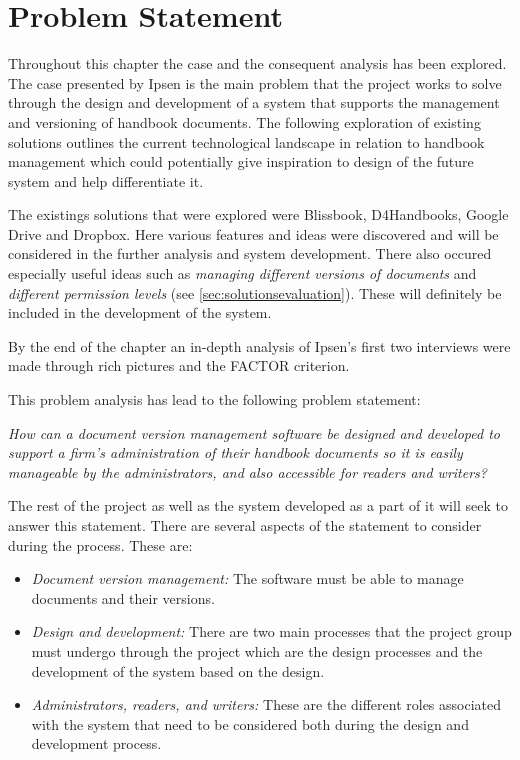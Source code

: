 \section{Problem Statement} \label{problemstatement}
Throughout this chapter the case and the consequent analysis has been explored.
The case presented by Ipsen is the main problem that the project works to solve through the design and development of a system that supports the management and versioning of handbook documents.
The following exploration of existing solutions outlines the current technological landscape in relation to handbook management which could potentially give inspiration to design of the future system and help differentiate it.

The existings solutions that were explored were Blissbook, D4Handbooks, Google Drive and Dropbox.
Here various features and ideas were discovered and will be considered in the further analysis and system development.
There also occured especially useful ideas such as \textit{managing different versions of documents} and \textit{different permission levels} (see \cref{sec:solutionsevaluation}).
These will definitely be included in the development of the system.

By the end of the chapter an in-depth analysis of Ipsen's first two interviews were made through rich pictures and the FACTOR criterion.

This problem analysis has lead to the following problem statement:

\begin{center}
\textit{How can a document version management software be designed and developed to support a firm's administration of their handbook documents so it is easily manageable by the administrators, and also accessible for readers and writers?}
\end{center}

The rest of the project as well as  the system developed as a part of it will seek to answer this statement.
There are several aspects of the statement to consider during the process.
These are:
\begin{itemize}
	\item
		\textit{Document version management:}
		The software must be able to manage documents and their versions.
	\item
		\textit{Design and development:}
		There are two main processes that the project group must undergo through the project which are the design processes and the development of the system based on the design.
	\item
		\textit{Administrators, readers, and writers:}
		These are the different roles associated with the system that need to be considered both during the design and development process.
\end{itemize}

